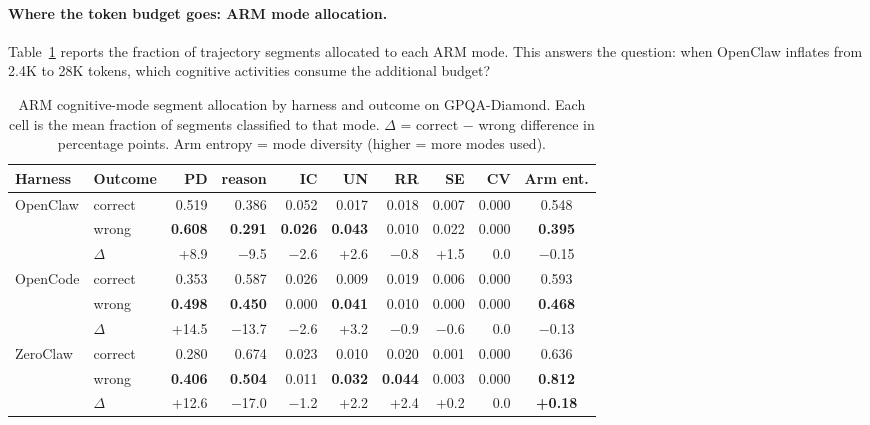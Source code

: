 \paragraph{Where the token budget goes: ARM mode allocation.}

Table~\ref{tab:gpqa-arm-budget} reports the fraction of trajectory segments
allocated to each ARM mode.
This answers the question: when OpenClaw inflates from 2.4K to 28K tokens,
which cognitive activities consume the additional budget?

\begin{table}[t]
\centering
\small
\caption{%
  ARM cognitive-mode segment allocation by harness and outcome on GPQA-Diamond.
  Each cell is the mean fraction of segments classified to that mode.
  $\Delta$ = correct $-$ wrong difference in percentage points.
  Arm entropy = mode diversity (higher = more modes used).
}
\label{tab:gpqa-arm-budget}
\setlength{\tabcolsep}{3pt}
\begin{tabular}{llrrrrrrrc}
\toprule
Harness & Outcome & PD & reason & IC & UN & RR & SE & CV & Arm ent. \\
\midrule
\multirow{2}{*}{OpenClaw}
 & correct & 0.519 & 0.386 & 0.052 & 0.017 & 0.018 & 0.007 & 0.000 & 0.548 \\
 & wrong   & \textbf{0.608} & \textbf{0.291} & \textbf{0.026} & \textbf{0.043} & 0.010 & 0.022 & 0.000 & \textbf{0.395} \\
 & $\Delta$ & +8.9 & $-$9.5 & $-$2.6 & +2.6 & $-$0.8 & +1.5 & 0.0 & $-$0.15 \\
\midrule
\multirow{2}{*}{OpenCode}
 & correct & 0.353 & 0.587 & 0.026 & 0.009 & 0.019 & 0.006 & 0.000 & 0.593 \\
 & wrong   & \textbf{0.498} & \textbf{0.450} & 0.000 & \textbf{0.041} & 0.010 & 0.000 & 0.000 & \textbf{0.468} \\
 & $\Delta$ & +14.5 & $-$13.7 & $-$2.6 & +3.2 & $-$0.9 & $-$0.6 & 0.0 & $-$0.13 \\
\midrule
\multirow{2}{*}{ZeroClaw}
 & correct & 0.280 & 0.674 & 0.023 & 0.010 & 0.020 & 0.001 & 0.000 & 0.636 \\
 & wrong   & \textbf{0.406} & \textbf{0.504} & 0.011 & \textbf{0.032} & \textbf{0.044} & 0.003 & 0.000 & \textbf{0.812} \\
 & $\Delta$ & +12.6 & $-$17.0 & $-$1.2 & +2.2 & +2.4 & +0.2 & 0.0 & \textbf{+0.18} \\
\bottomrule
\end{tabular}
\end{table}

